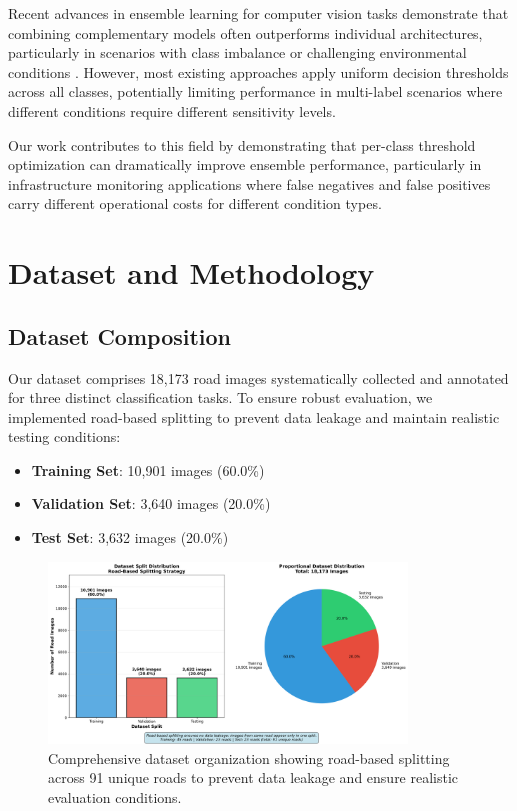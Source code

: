 \documentclass[12pt]{article}
\begin{document}
Recent advances in ensemble learning for computer vision tasks demonstrate that combining complementary models often outperforms individual architectures, particularly in scenarios with class imbalance or challenging environmental conditions \citet{bishop2006pattern}. However, most existing approaches apply uniform decision thresholds across all classes, potentially limiting performance in multi-label scenarios where different conditions require different sensitivity levels.

Our work contributes to this field by demonstrating that per-class threshold optimization can dramatically improve ensemble performance, particularly in infrastructure monitoring applications where false negatives and false positives carry different operational costs for different condition types.

\section{Dataset and Methodology}

\subsection{Dataset Composition}

Our dataset comprises 18,173 road images systematically collected and annotated for three distinct classification tasks. To ensure robust evaluation, we implemented road-based splitting to prevent data leakage and maintain realistic testing conditions:

\begin{itemize}[itemsep=1pt,parsep=0pt,topsep=3pt]
\item \textbf{Training Set}: 10,901 images (60.0\%)
\item \textbf{Validation Set}: 3,640 images (20.0\%)
\item \textbf{Test Set}: 3,632 images (20.0\%)
\end{itemize}

\begin{figure}[!htb]
\centering
\includegraphics[width=0.85\textwidth]{images/dataset_split_analysis.png}
\caption{Comprehensive dataset organization showing road-based splitting across 91 unique roads to prevent data leakage and ensure realistic evaluation conditions.}
\end{figure}
\end{document}
